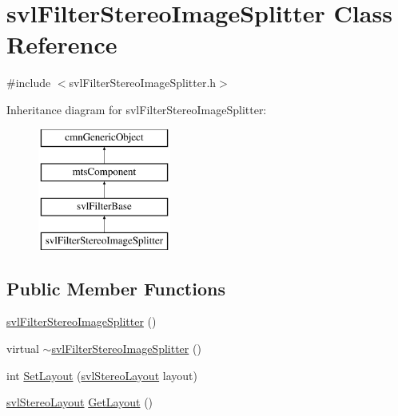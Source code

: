 \hypertarget{classsvl_filter_stereo_image_splitter}{}\section{svl\+Filter\+Stereo\+Image\+Splitter Class Reference}
\label{classsvl_filter_stereo_image_splitter}


{\ttfamily \#include $<$svl\+Filter\+Stereo\+Image\+Splitter.\+h$>$}

Inheritance diagram for svl\+Filter\+Stereo\+Image\+Splitter\+:\begin{figure}[H]
\begin{center}
\leavevmode
\includegraphics[height=4.000000cm]{dd/d18/classsvl_filter_stereo_image_splitter}
\end{center}
\end{figure}
\subsection*{Public Member Functions}
\begin{DoxyCompactItemize}
\item 
\hyperlink{classsvl_filter_stereo_image_splitter_af4c3b59e317fb02e778add754680756f}{svl\+Filter\+Stereo\+Image\+Splitter} ()
\item 
virtual \hyperlink{classsvl_filter_stereo_image_splitter_ac70ff51c7cd566aa8e303f0d22f7b004}{$\sim$svl\+Filter\+Stereo\+Image\+Splitter} ()
\item 
int \hyperlink{classsvl_filter_stereo_image_splitter_a55390c58a269f1578a1f85026de50f20}{Set\+Layout} (\hyperlink{svl_definitions_8h_aa90f34342a069f42a847f43f2abb812f}{svl\+Stereo\+Layout} layout)
\item 
\hyperlink{svl_definitions_8h_aa90f34342a069f42a847f43f2abb812f}{svl\+Stereo\+Layout} \hyperlink{classsvl_filter_stereo_image_splitter_ade4377378c9b33165c3d67515bde172f}{Get\+Layout} ()
\end{DoxyCompactItemize}
